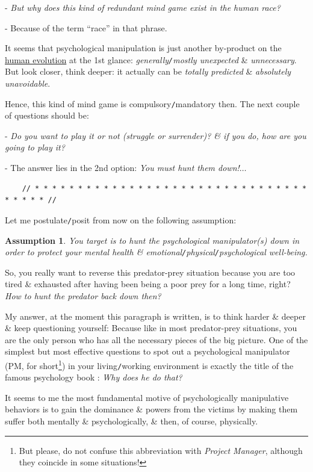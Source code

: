 \documentclass[12pt]{article}
\newtheorem{assumption}{Assumption}
\begin{document}
- {\it But why does this kind of redundant mind game exist in the human race?}

- Because of the term ``race'' in that phrase.

It seems that psychological manipulation is just another by-product on the \href{https://en.wikipedia.org/wiki/Human_evolution}{human evolution} at the 1st glance: {\it generally{\tt/}mostly unexpected} \& {\it unnecessary}. But look closer, think deeper: it actually can be {\it totally predicted} \& {\it absolutely unavoidable}.

Hence, this kind of mind game is compulsory{\tt/}mandatory then. The next couple of questions should be:

- {\it Do you want to play it or not (struggle or surrender)? \& if you do, how are you going to play it?}

- The answer lies in the 2nd option: {\it You must hunt them down!$\ldots$}

\begin{verbatim}
	// * * * * * * * * * * * * * * * * * * * * * * * * * * * * * * * * * * * * * //
\end{verbatim}

\noindent
{} Let me postulate{\tt/}posit from now on the following assumption:

\begin{assumption}
	You target is to hunt the psychological manipulator(s) down in order to protect your mental health \& emotional{\tt/}physical{\tt/}psychological well-being.
\end{assumption}
So, you really want to reverse this predator-prey situation because you are too tired \& exhausted after having been being a poor prey for a long time, right? {\it How to hunt the predator back down then?}

My answer, at the moment this paragraph is written, is to think harder \& deeper \& keep questioning yourself: Because like in most predator-prey situations, you are the only person who has all the necessary pieces of the big picture. One of the simplest but most effective questions to spot out a psychological manipulator (PM, for short\footnote{But please, do not confuse this abbreviation with {\it Project Manager}, although they coincide in some situations!}) in your living{\tt/}working environment is exactly the title of the famous psychology book \cite{Bancroft2003}: {\it Why does he do that?}

It seems to me the most fundamental motive of psychologically manipulative behaviors is to gain the dominance \& powers from the victims by making them suffer both mentally \& psychologically, \& then, of course, physically. 
\end{document}
